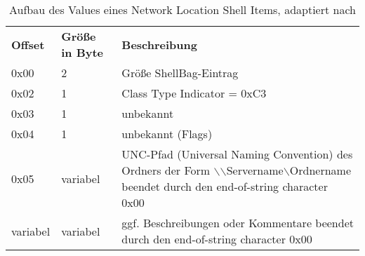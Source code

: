 \begin{longtable}{|p{}|p{}|p{}|}
	\caption{Aufbau des Values eines Network Location Shell Items, adaptiert nach \cite{shelltype}} \label{netw} \vspace{1em} \\
	\hline
	\cellcolor{gray!25}\textbf{Offset} & \cellcolor{gray!25}\textbf{Größe in Byte} & \cellcolor{gray!25}\textbf{Beschreibung} \\
	\hline
	0x00 & 2 & Größe ShellBag-Eintrag\\
	\hline
	0x02 & 1 & Class Type Indicator = 0xC3 \\
	\hline
	0x03 & 1 & unbekannt \\
	\hline
	0x04 & 1 & unbekannt (Flags) \\
	\hline
	0x05 & variabel & UNC-Pfad (Universal Naming Convention) des Ordners der Form $\backslash$$\backslash$Servername$\backslash$Ordnername beendet durch den \glqq end-of-string character\grqq{} 0x00 \\
	\hline
	variabel & variabel & ggf. Beschreibungen oder Kommentare beendet durch den \glqq end-of-string character\grqq{} 0x00\\
	\hline
\end{longtable}
\vspace{1em}
